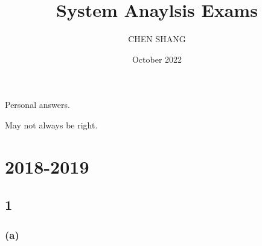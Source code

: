 \documentclass{article}
\title{System Anaylsis Exams}
\author{CHEN SHANG }
\date{October 2022}
\begin{document}
\maketitle

{\Huge
Personal answers.\par
May not always be right.\par}
\section*{2018-2019}
\subsection*{1}
\subsubsection*{(a)}
\end{document}
